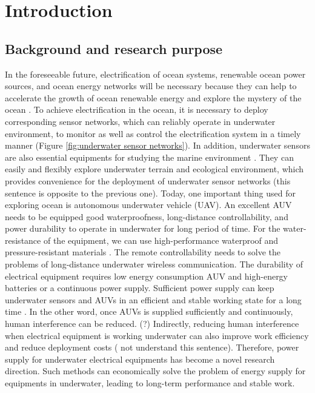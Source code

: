\chapter{Introduction}
\section{Background and research purpose}
In the foreseeable future, electrification of ocean systems, renewable ocean power sources, and ocean energy networks will be necessary because they can help to accelerate the growth of ocean renewable energy and explore the mystery of the ocean \cite{Orekan, Randhawa2015}. 
To achieve electrification in the ocean, it is necessary to deploy corresponding sensor networks, which can reliably operate in underwater environment, %
to monitor as well as control the electrification system in a timely manner (Figure \ref{fig:underwater sensor networks}). 
In addition, underwater sensors are also essential equipments for studying the marine environment \cite{Heidemann2012, Wu2020}. 
They can easily and flexibly explore underwater terrain and ecological environment, which provides convenience for the deployment of underwater sensor networks (this sentence is opposite to the previous one). 
Today, one important thing used for exploring ocean is autonomous underwater vehicle (UAV).
An excellent AUV needs to be equipped good waterproofness, long-distance controllability, and power durability to operate in underwater for long period of time. For the water-resistance of the equipment, we can use high-performance waterproof and pressure-resistant materials \cite{Hwang2019, Tran2020, Bradley2001}. 
The remote controllability needs to solve the problems of long-distance underwater wireless communication. 
The durability of electrical equipment requires low energy consumption AUV and high-energy batteries or a continuous power supply. 
Sufficient power supply can keep underwater sensors and AUVs in an efficient and stable working state for a long time \cite{Jurdak2006}. 
In the other word, once AUVs is supplied sufficiently and continuously, human interference can be reduced. (?)
Indirectly, reducing human interference when electrical equipment is working underwater can also improve work efficiency and reduce deployment costs ({\color{red} not understand this sentence}). 
Therefore, power supply for underwater electrical equipments has become a novel research direction. Such methods can economically solve the problem of energy supply for equipments in underwater, leading to long-term performance and stable work.

